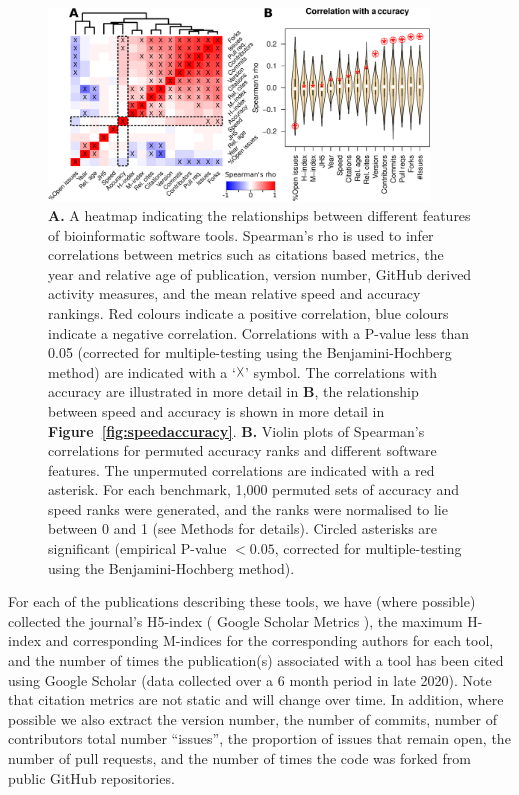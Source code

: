 \documentclass{bmcart}
\begin{document}
\begin{figure}[htb!]
\includegraphics[width=0.9\textwidth]{figure1.pdf}
\caption{\textbf{A.} A heatmap indicating the relationships between
  different features of bioinformatic software tools. Spearman’s rho
  is used to infer correlations between metrics such as citations
  based metrics, the year and relative age of publication, version
  number, GitHub derived activity measures, and the mean relative
  speed and accuracy rankings. Red colours indicate a positive
  correlation, blue colours indicate a negative
  correlation. Correlations with a P-value less than 0.05 (corrected
  for multiple-testing using the Benjamini-Hochberg method) are
  indicated with a `$\vartimes$' symbol. The correlations with
  accuracy are illustrated in more detail in \textbf{B}, the
  relationship between speed and accuracy is shown in more detail in
  \textbf{Figure~\ref{fig:speedaccuracy}}. \textbf{B.} Violin plots of Spearman's
  correlations for permuted accuracy ranks and different software
  features.  The unpermuted correlations are indicated with a red
  asterisk.  For each benchmark, 1,000 permuted sets of accuracy and
  speed ranks were generated, and the ranks were normalised to lie
  between 0 and 1 (see Methods for details). Circled asterisks are
  significant (empirical P-value $< 0.05$, corrected for
  multiple-testing using the Benjamini-Hochberg method).}
\label{fig:allfactors}
\end{figure}

For each of the publications describing these tools, we have (where
possible) collected the journal's H5-index (
Google Scholar Metrics
), the maximum H-index and
corresponding M-indices \cite{Hirsch2005-mt} for the corresponding
authors for each tool, and the number of times the publication(s)
associated with a tool has been cited using Google Scholar (data
collected over a 6 month period in late 2020). Note that citation metrics
are not static and will change over time. In addition, where possible we also extract the version number, the number
of commits, number of contributors
{\color{red} total number ``issues'', the proportion of issues that remain open, the number of pull requests, and the number of times the code was forked}
from public GitHub repositories.  
\end{document}
